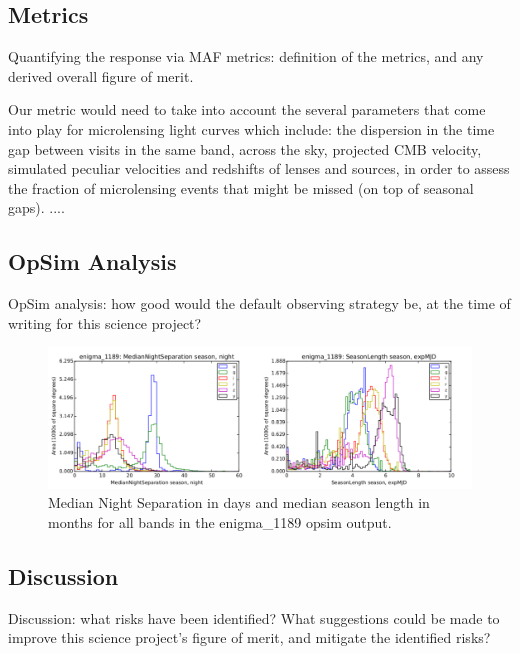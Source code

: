 \subsection{Metrics}
\label{sec:\secname:metrics}

Quantifying the response via MAF metrics: definition of the metrics,
and any derived overall figure of merit.

Our metric would need to take into account the several parameters that come into 
play for microlensing light curves which include: the dispersion in the time gap 
between visits in the same band, across the sky, projected CMB velocity, 
simulated peculiar velocities and redshifts of lenses and sources, in order to 
assess the fraction of microlensing events that might be missed (on top of 
seasonal gaps).
....



\subsection{OpSim Analysis}
\label{sec:\secname:analysis}

OpSim analysis: how good would the default observing strategy be, at
the time of writing for this science project?

\begin{center}
\begin{figure}
\includegraphics[width=\textwidth]{figs/agn/enigma_1189_NightSep_seasonLength.pdf}
\caption{Median Night Separation in days and median season length in months for all bands in the enigma\_1189 opsim output.}
\label{microfig}
\end{figure}
\end{center}


\subsection{Discussion}
\label{sec:\secname:discussion}

Discussion: what risks have been identified? What suggestions could be
made to improve this science project's figure of merit, and mitigate
the identified risks?



\navigationbar
